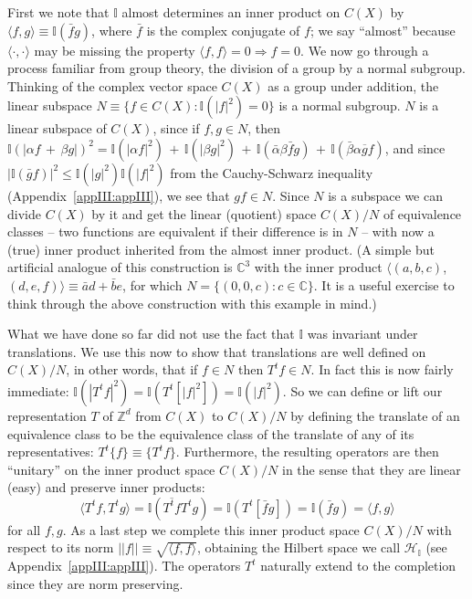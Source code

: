 \documentclass[reqno]{stml-l}
\theoremstyle{plain}
\theoremstyle{definition}
\numberwithin{equation}{chapter}
\begin{document}
First we note that $\mathbb{I}$ almost determines an inner product on $C(X)$ by $\langle f,g\rangle\equiv\mathbb{I}(\bar{f}g)$, where $\bar{f}$ is the complex conjugate of $f$; we say ``almost'' because $\langle\cdot,\cdot\rangle$ may be missing the property $\langle f, f\rangle=0\Rightarrow f=0$. We now go through a process familiar from group theory, the division of a group by a normal subgroup. Thinking of the complex vector space $C(X)$ as a group under addition, the linear subspace $N\equiv\{f\in C(X) : \mathbb{I}(|f|^{2})=0\}$ is a normal subgroup. $N$ is a linear subspace of $C(X)$, since if $f,g\in N$, then $\mathbb{I} (|\alpha f\,+\,\beta g|)^{2}=\mathbb{I}(|\alpha f|^{2})\,+\,\mathbb{I}(|\beta g|^{2})\,+\,\mathbb{I} (\bar{\alpha}\beta\bar{f}g)\,+\,\mathbb{I}(\bar{\beta}\alpha\overline{g}f)$, and since $|\mathbb{I}(\bar{g}f)|^{2}\leq \mathbb{I}(|g|^{2})\mathbb{I}(|f|^{2})$ from the Cauchy-Schwarz inequality (Appendix~\ref{appIII:appIII}), we see that $gf\in N$. Since $N$ is a subspace we can divide $C(X)$ by it and get the linear (quotient) space $C(X)/N$ of equivalence classes -- two functions are equivalent if their difference is in $N$ -- with now a (true) inner product inherited from the almost inner product. (A simple but artificial analogue of this construction is $\mathbb{C}^{3}$ with the inner product $\langle(a, b, c)$, $(d, e, f)\rangle\equiv\bar{a}d+\bar{b}e$, for which $N=\{(0,0, c):c\in \mathbb{C}\}$. It is a useful exercise to think through the above construction with this example in mind.)

What we have done so far did not use the fact that $\mathbb{I}$ was invariant under translations. We use this now to show that translations are well defined on $C(X)/N$, in other words, that if $f\in N$ then $T^{t}f\in N$. In fact this is now fairly immediate: $\mathbb{I}(|T^{t}f|^{2})=\mathbb{I}(T^{t}[|f|^{2}])=\mathbb{I}(|f|^{2})$. So we can define or lift our representation $T$ of $\mathbb{Z}^{d}$ from $C(X)$ to $C(X)/N$ by defining the translate of an equivalence class to be the equivalence class of the translate of any of its representatives: $T^{t}\{f\}\equiv\{T^{t}f\}$. Furthermore, the resulting operators are then ``unitary'' on the inner product space $C(X)/N$ in the sense that they are linear (easy) and preserve inner products:
\begin{equation}
\langle T^{t}f,T^{t}g\rangle=\mathbb{I}(\overline{T^{t}f}T^{t}g)=\mathbb{I}(T^{t}[\bar{f}g])=\mathbb{I}(\bar{f}g)=\langle f, g\rangle\label{ch03:eqn3.1}
\end{equation}
for all $f,g$. As a last step we complete this inner product space $C(X)/N$ with respect to its norm $||f||\equiv\sqrt{\langle f,f\rangle}$, obtaining the Hilbert space we call $\mathcal{H}_{\mathbb{I}}$ (see Appendix~\ref{appIII:appIII}). The operators $T^{t}$ naturally extend to the completion since they are norm preserving.
\end{document}
